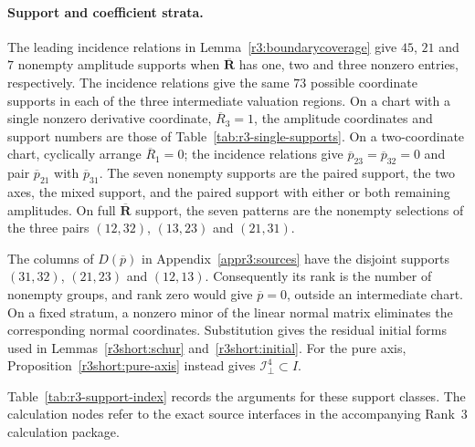 \documentclass[11pt,a4paper]{article}
\numberwithin{equation}{section}
\theoremstyle{plain}
\theoremstyle{definition}
\theoremstyle{remark}
\begin{document}
\paragraph{Support and coefficient strata.}\label{appr3:coverageindex}
The leading incidence relations in Lemma~\ref{r3:boundarycoverage}
give $45$, $21$ and $7$ nonempty amplitude supports when
$\overline{\boldsymbol R}$ has one, two and three nonzero entries,
respectively. The incidence relations give the same $73$ possible
coordinate supports in each of the three intermediate valuation
regions. On a chart with a single nonzero derivative coordinate,
$\overline R_3=1$, the amplitude coordinates and support numbers are
those of Table~\ref{tab:r3-single-supports}. On a two-coordinate
chart, cyclically arrange $\overline R_1=0$; the incidence relations
give $\overline p_{23}=\overline p_{32}=0$ and pair
$\overline p_{21}$ with $\overline p_{31}$. The seven nonempty
supports are the paired support, the two axes, the mixed support,
and the paired support with either or both remaining amplitudes.
On full $\overline{\boldsymbol R}$ support, the seven patterns are
the nonempty selections of the three pairs
$(12,32)$, $(13,23)$ and $(21,31)$.

The columns of $D(\overline p)$ in Appendix~\ref{appr3:sources} have the
disjoint supports $(31,32)$, $(21,23)$ and $(12,13)$.
Consequently its rank is the number of nonempty groups, and rank
zero would give $\overline p=0$, outside an intermediate chart.
On a fixed stratum, a nonzero minor of the linear normal matrix
eliminates the corresponding normal coordinates. Substitution gives
the residual initial forms used in Lemmas~\ref{r3short:schur}
and~\ref{r3short:initial}.
For the pure axis, Proposition~\ref{r3short:pure-axis} instead gives
$\mathcal I_\perp^4\subset I$.

Table~\ref{tab:r3-support-index} records the arguments for these
support classes. The calculation nodes refer to the exact source
interfaces in the accompanying Rank~3 calculation package.
\end{document}
